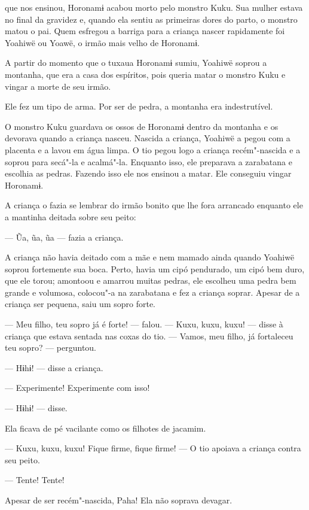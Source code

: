  

 que nos ensinou, Horonamɨ acabou morto pelo monstro Kuku.
Sua mulher estava no final da gravidez e, quando ela sentiu as primeiras
dores do parto, o monstro matou o pai. Quem esfregou a barriga para a
criança nascer rapidamente foi Yoahiwë ou Yoawë, o irmão mais velho de
Horonamɨ. 

A partir do momento que o tuxaua Horonamɨ sumiu, Yoahiwë soprou a
montanha, que era a casa dos espíritos, pois queria matar o monstro Kuku
e vingar a morte de seu irmão. 

Ele fez um tipo de arma. Por ser de pedra, a montanha era
indestrutível. 

O monstro Kuku guardava os ossos de Horonamɨ dentro da montanha e os
devorava quando a criança nasceu. Nascida a criança, Yoahiwë a pegou com
a placenta e a lavou em água limpa. O tio pegou logo a criança
recém"-nascida e a soprou para secá"-la e acalmá"-la. Enquanto isso, ele
preparava a zarabatana e escolhia as pedras. Fazendo isso ele nos
ensinou a matar. Ele conseguiu vingar Horonamɨ. 

A criança o fazia se lembrar do irmão bonito que lhe fora arrancado
enquanto ele a mantinha deitada sobre seu peito:

--- Ũa, ũa, ũa --- fazia a criança. 

A criança não havia deitado com a mãe e nem mamado ainda quando Yoahiwë
soprou fortemente sua boca. Perto, havia um cipó pendurado, um cipó bem
duro, que ele torou; amontoou e amarrou muitas pedras, ele escolheu uma
pedra bem grande e volumosa, colocou"-a na zarabatana e fez a criança
soprar. Apesar de a criança ser pequena, saiu um sopro forte. 

--- Meu filho, teu sopro já é forte! --- falou. --- Kuxu, kuxu,
kuxu! --- disse à criança que estava sentada nas coxas do
tio. --- Vamos, meu filho, já fortaleceu teu sopro? --- perguntou.

--- Hɨhɨ! --- disse a criança. 

--- Experimente! Experimente com isso! 

--- Hɨhɨ! --- disse. 

Ela ficava de pé vacilante como os filhotes de jacamim. 

--- Kuxu, kuxu, kuxu! Fique firme, fique firme! --- O tio apoiava a
criança contra seu peito. 

--- Tente! Tente! 

Apesar de ser recém"-nascida, Paha! Ela não soprava devagar. 

